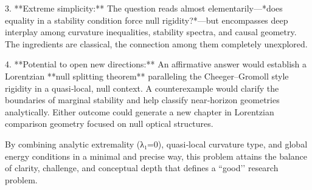 3. **Extreme simplicity:**  
The question reads almost elementarily—*does equality in a stability condition force null rigidity?*—but encompasses deep interplay among curvature inequalities, stability spectra, and causal geometry. The ingredients are classical, the connection among them completely unexplored.

4. **Potential to open new directions:**  
An affirmative answer would establish a Lorentzian **null splitting theorem** paralleling the Cheeger–Gromoll style rigidity in a quasi‑local, null context. A counterexample would clarify the boundaries of marginal stability and help classify near‑horizon geometries analytically. Either outcome could generate a new chapter in Lorentzian comparison geometry focused on null optical structures.

By combining analytic extremality (λ₁=0), quasi‑local curvature type, and global energy conditions in a minimal and precise way, this problem attains the balance of clarity, challenge, and conceptual depth that defines a “good’’ research problem.